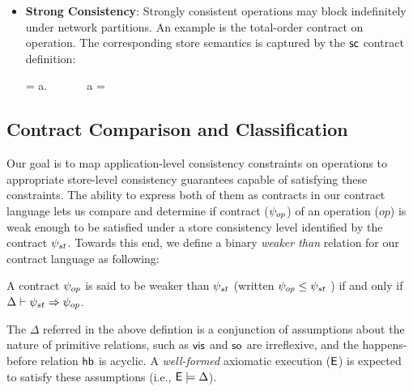 \begin{itemize}
\item \textbf{Strong Consistency}: Strongly consistent operations may block
  indefinitely under network partitions. An example is the total-order
  contract on  operation. The corresponding store semantics is
  captured by the ${\sf sc}$ contract definition:

  \vspace{-1em}
  \begin{smathpar}
  \scc = \forall a.~ \Rightarrow {} ~\vee~  ~\vee~ a = \cureff
  \end{smathpar}

\end{itemize}





\subsection{Contract Comparison and Classification}

Our goal is to map application-level consistency constraints on
operations to appropriate store-level consistency guarantees capable
of satisfying these constraints.  The ability to express both of them as
contracts in our contract language lets us compare and determine if
contract ($\psi_{op}$) of an operation ($\mathit{op}$) is weak enough to be
satisfied under a store consistency level identified by the contract
$\psi_{st}$. Towards this end, we define a binary \emph{weaker than}
relation for our contract language as following:

\begin{definition}
A contract $\psi_{op}$ is said to be weaker than $\psi_{st}$ (written $\psi_{op}
\le \psi_{st}$ ) if and only if $\Delta \vdash \psi_{st} \Rightarrow \psi_{op}$.
\begin{center}
\end{center}
\end{definition}

\vspace{-1em}
\noindent The $\Delta$ referred in the above defintion is a
conjunction of assumptions about the nature of primitive relations,
such as ${\normalfont \textsf{vis}}$ and ${\normalfont \textsf{so}}$ are irreflexive, and the happens-before
relation ${\normalfont \textsf{hb}}$ is acyclic. A \emph{well-formed} axiomatic execution
(${\normalfont \textsf{E}}$) is expected to satisfy these assumptions (i.e., ${\normalfont \textsf{E}} \models
\Delta$).

